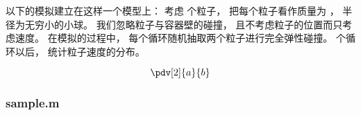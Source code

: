 

以下的模拟建立在这样一个模型上： 考虑  个粒子， 把每个粒子看作质量为 ， 半径为无穷小的小球。 我们忽略粒子与容器壁的碰撞， 且不考虑粒子的位置而只考虑速度。 在模拟的过程中， 每个循环随机抽取两个粒子进行完全弹性碰撞。  个循环以后， 统计粒子速度的分布。

\begin{equation}
\pdv[2]{a}{b}
\end{equation}

\subsubsection{sample.m}
